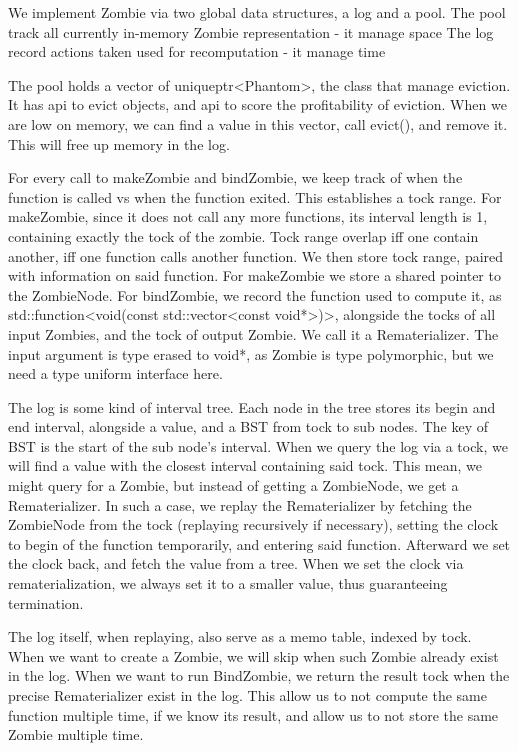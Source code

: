 \documentclass[acmsmall]{acmart}
\begin{document}
	We implement Zombie via two global data structures, a log and a pool.
	The pool track all currently in-memory Zombie representation - it manage space
	The log record actions taken used for recomputation - it manage time
	
	The pool holds a vector of uniqueptr<Phantom>, the class that manage eviction.
	It has api to evict objects, and api to score the profitability of eviction.
	When we are low on memory, we can find a value in this vector, call evict(), and remove it.
	This will free up memory in the log.
	
	For every call to makeZombie and bindZombie, we keep track of when the function is called vs when the function exited. This establishes a tock range. 
	For makeZombie, since it does not call any more functions, its interval length is 1, containing exactly the tock of the zombie.
	Tock range overlap iff one contain another, iff one function calls another function. We then store tock range, paired with information on said function. 
	For makeZombie we store a shared pointer to the ZombieNode. 
	For bindZombie, we record the function used to compute it, as std::function<void(const std::vector<const void*>)>, alongside the tocks of all input Zombies, and the tock of output Zombie. We call it a Rematerializer. The input argument is type erased to void*, as Zombie is type polymorphic, but we need a type uniform interface here.
	
	The log is some kind of interval tree. Each node in the tree stores its begin and end interval, alongside a value, and a BST from tock to sub nodes. The key of BST is the start of the sub node’s interval. When we query the log via a tock, we will find a value with the closest interval containing said tock. This mean, we might query for a Zombie, but instead of getting a ZombieNode, we get a Rematerializer.
	In such a case, we replay the Rematerializer by fetching the ZombieNode from the tock (replaying recursively if necessary), setting the clock to begin of the function temporarily, and entering said function. Afterward we set the clock back, and fetch the value from a tree.
	When we set the clock via rematerialization, we always set it to a smaller value, thus guaranteeing termination.
	
	The log itself, when replaying, also serve as a memo table, indexed by tock. When we want to create a Zombie, we will skip when such Zombie already exist in the log. When we want to run BindZombie, we return the result tock when the precise Rematerializer exist in the log. This allow us to not compute the same function multiple time, if we know its result, and allow us to not store the same Zombie multiple time.
	
\end{document}
